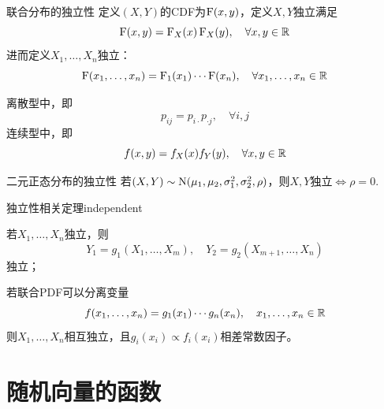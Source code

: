 \begin{definition}{联合分布的独立性}{}
	定义$(X,Y)$的CDF为$\operatorname{F}(x,y)$，定义$X,Y$独立满足
	\begin{equation}
		\operatorname{F}(x,y)=\operatorname{F}_X(x)\operatorname{F}_X(y),\quad\forall x,y\in\mathbb R
	\end{equation}
	进而定义$X_1,\ldots,X_n$独立： 
	\[
		\operatorname{F}(x_1,\ldots,x_n)=\operatorname{F}_1(x_1)\cdots\operatorname{F}(x_n),\quad\forall x_1,\ldots,x_n\in\mathbb R
	\]
\end{definition}
\begin{corollary}
	离散型中，即
	\[
		p_{ij}=p_{i\cdot}p_{\cdot j},\quad \forall i,j
	\]
	连续型中，即
	\[
		f(x,y)=f_X(x)f_Y(y),\quad \forall x,y\in\mathbb R
	\]
\end{corollary}
\begin{example}{二元正态分布的独立性}{}
	若$(X,Y)\sim\operatorname{N}(\mu_1,\mu_2,\sigma_1^2,\sigma_2^2,\rho)$，则$X,Y$独立$\iff\rho=0.$
\end{example}


\begin{theorem}{独立性相关定理}{independent}
	\begin{compactenum}
		\item 若$X_1,\ldots,X_n$独立，则
		\[
			Y_1=g_1(X_1,\ldots,X_m),\quad Y_2=g_2(X_{m+1},\ldots,X_n)
		\]
		独立；
		\item 若联合PDF可以分离变量
		\[
			f(x_1,\ldots,x_n)=g_1(x_1)\cdots g_n(x_n),\quad x_1,\ldots,x_n\in\mathbb R
		\]
		则$X_1,\ldots,X_n$相互独立，且$g_i(x_i)\propto f_i(x_i)$相差常数因子。
	\end{compactenum}
\end{theorem}

\section{随机向量的函数}

